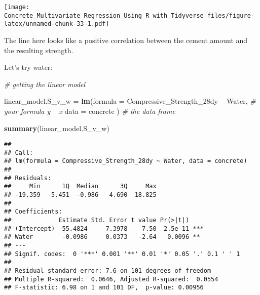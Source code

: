 \documentclass[]{article}
\newenvironment{Shaded}{\begin{snugshade}}{\end{snugshade}}
\newcommand{\CommentTok}[1]{\textcolor[rgb]{0.56,0.35,0.01}{\textit{#1}}}
\newcommand{\DataTypeTok}[1]{\textcolor[rgb]{0.13,0.29,0.53}{#1}}
\newcommand{\KeywordTok}[1]{\textcolor[rgb]{0.13,0.29,0.53}{\textbf{#1}}}
\newcommand{\NormalTok}[1]{#1}
\newcommand{\OperatorTok}[1]{\textcolor[rgb]{0.81,0.36,0.00}{\textbf{#1}}}
\newcommand{\StringTok}[1]{\textcolor[rgb]{0.31,0.60,0.02}{#1}}
\begin{document}
\texttt{[image: Concrete\_Multivariate\_Regression\_Using\_R\_with\_Tidyverse\_files/figure-latex/unnamed-chunk-33-1.pdf]}

The line here looks like a positive correlation between the cement
amount and the resulting strength.

Let's try water:

\begin{Shaded}
\begin{Highlighting}[]
\CommentTok{# getting the linear model}


\NormalTok{linear_model.S_v_w =}\StringTok{  }\KeywordTok{lm}\NormalTok{(}\DataTypeTok{formula =}\NormalTok{ Compressive_Strength_28dy }\OperatorTok{~}\StringTok{ }\NormalTok{Water, }\CommentTok{# your formula y ~ x}
                         \DataTypeTok{data    =}\NormalTok{ concrete   )                           }\CommentTok{# the data frame}

\KeywordTok{summary}\NormalTok{(linear_model.S_v_w)}
\end{Highlighting}
\end{Shaded}

\begin{verbatim}
## 
## Call:
## lm(formula = Compressive_Strength_28dy ~ Water, data = concrete)
## 
## Residuals:
##     Min      1Q  Median      3Q     Max 
## -19.359  -5.451  -0.986   4.690  18.825 
## 
## Coefficients:
##             Estimate Std. Error t value Pr(>|t|)    
## (Intercept)  55.4824     7.3978    7.50  2.5e-11 ***
## Water        -0.0986     0.0373   -2.64   0.0096 ** 
## ---
## Signif. codes:  0 '***' 0.001 '**' 0.01 '*' 0.05 '.' 0.1 ' ' 1
## 
## Residual standard error: 7.6 on 101 degrees of freedom
## Multiple R-squared:  0.0646, Adjusted R-squared:  0.0554 
## F-statistic: 6.98 on 1 and 101 DF,  p-value: 0.00956
\end{verbatim}
\end{document}
